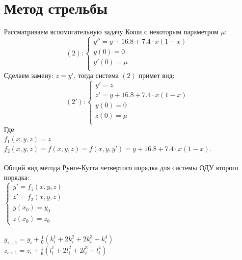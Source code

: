 \documentclass[12pt,a4paper]{article}
\begin{document}
    \section*{Метод стрельбы}
        Рассматриваем вспомогательную задачу Коши с некоторым параметром $\mu$:\\
        \[
        (2):
        \begin{cases}
        	y'' = y + 16.8 + 7.4 \cdot x(1 - x)\\
	        y(0) = 0\\
    	    y'(0) = \mu\\
        \end{cases}
        \]
        Сделаем замену: $z = y'$, тогда система $(2)$ примет вид:\\
        \[
        (2'):
        \begin{cases}
        	y' = z\\
        	z' = y + 16.8 + 7.4 \cdot x(1 - x)\\
        	y(0) = 0\\
        	z(0) = \mu\\
        \end{cases}
        \]
        Где:\\
        $f_{1}(x, y, z) = z$\\
        $f_{2}(x, y, z) = f(x, y, z) = f(x, y, y') = y + 16.8 + 7.4 \cdot x(1 - x)$.\\\\
        
        \noindent
        Общий вид метода Рунге-Кутта четвертого порядка для системы ОДУ второго порядка:\\
        $\begin{cases}
        	y' = f_{1}(x, y, z)\\
        	z' = f_{2}(x, y, z)\\
        	y(x_{0}) = y_{0}\\
        	z(x_{0}) = z_{0}
        \end{cases}$\\\\
        
        \noindent
        $y_{i+1} = y_{i} + \frac{1}{6}(k_{i}^{1} +2k_{i}^{2} + 2k_{i}^3 + k_{i}^4)$\\
        $z_{i+1} = z_{i} + \frac{1}{6}(l_{i}^{1} +2l_{i}^{2} + 2l_{i}^3 + l_{i}^4)$\\
        
\end{document}
